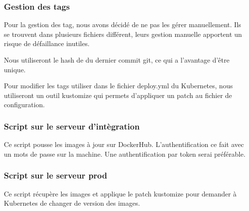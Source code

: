\subsubsection{Gestion des tags}
Pour la gestion des tag, nous avons décidé de ne pas les gérer manuellement.
Ils se trouvent dans plusieurs fichiers différent, leurs gestion manuelle apportent un risque de défaillance inutiles.

Nous utiliseront le hash de du dernier commit git,  ce qui a l'avantage d’être unique.

Pour modifier les tags utiliser dans le fichier deploy.yml du Kubernetes,
nous utiliseront un outil kustomize qui permets d'appliquer un patch au fichier de configuration.



\subsubsection{Script sur le serveur d'intègration}
Ce script pousse les images à jour sur DockerHub.
L'authentification ce fait avec un mots de passe sur la machine.
Une authentification par token serai préférable.



\subsubsection{Script sur le serveur prod}
Ce script récupère les images et applique le patch kustomize pour demander à Kubernetes de changer de version des images.



